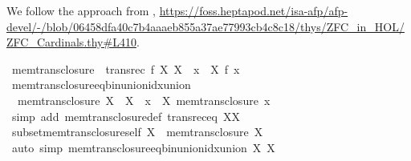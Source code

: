 \begin{isabellebody}
\begin{isamarkuptext}
We follow the approach from \cite{ZFC_in_HOL_AFP}, 
\url{https://foss.heptapod.net/isa-afp/afp-devel/-/blob/06458dfa40c7b4aaaeb855a37ae77993cb4c8c18/thys/ZFC_in_HOL/ZFC_Cardinals.thy\#L410}.%
\end{isamarkuptext}\isamarkuptrue%
\isamarkupfalse%
\ {\isachardoublequoteopen}mem{\isacharunderscore}{\kern0pt}trans{\isacharunderscore}{\kern0pt}closure\ {\isasymequiv}\ transrec\ {\isacharparenleft}{\kern0pt}{\isasymlambda}f\ X{\isachardot}{\kern0pt}\ X\ {\isasymunion}\ {\isacharparenleft}{\kern0pt}{\isasymUnion}x\ {\isasymin}\ X{\isachardot}{\kern0pt}\ f\ x{\isacharparenright}{\kern0pt}{\isacharparenright}{\kern0pt}{\isachardoublequoteclose}\isanewline
\isanewline
{}\isamarkupfalse%
\ mem{\isacharunderscore}{\kern0pt}trans{\isacharunderscore}{\kern0pt}closure{\isacharunderscore}{\kern0pt}eq{\isacharunderscore}{\kern0pt}bin{\isacharunderscore}{\kern0pt}union{\isacharunderscore}{\kern0pt}idx{\isacharunderscore}{\kern0pt}union{\isacharcolon}{\kern0pt}\isanewline
\ \ {\isachardoublequoteopen}mem{\isacharunderscore}{\kern0pt}trans{\isacharunderscore}{\kern0pt}closure\ X\ {\isacharequal}{\kern0pt}\ X\ {\isasymunion}\ {\isacharparenleft}{\kern0pt}{\isasymUnion}x\ {\isasymin}\ X{\isachardot}{\kern0pt}\ mem{\isacharunderscore}{\kern0pt}trans{\isacharunderscore}{\kern0pt}closure\ x{\isacharparenright}{\kern0pt}{\isachardoublequoteclose}\isanewline
%
\isadelimproof
\ \ %
\endisadelimproof
%
\isatagproof
{}\isamarkupfalse%
\ {\isacharparenleft}{\kern0pt}simp\ add{\isacharcolon}{\kern0pt}\ mem{\isacharunderscore}{\kern0pt}trans{\isacharunderscore}{\kern0pt}closure{\isacharunderscore}{\kern0pt}def\ transrec{\isacharunderscore}{\kern0pt}eq{\isacharbrackleft}{\kern0pt}\ {\isacharquery}{\kern0pt}X{\isacharequal}{\kern0pt}X{\isacharbrackright}{\kern0pt}{\isacharparenright}{\kern0pt}%
\endisatagproof
{\isafoldproof}%
%
\isadelimproof
\isanewline
%
\endisadelimproof
\isanewline
{}\isamarkupfalse%
\ subset{\isacharunderscore}{\kern0pt}mem{\isacharunderscore}{\kern0pt}trans{\isacharunderscore}{\kern0pt}closure{\isacharunderscore}{\kern0pt}self{\isacharcolon}{\kern0pt}\ {\isachardoublequoteopen}X\ {\isasymsubseteq}\ mem{\isacharunderscore}{\kern0pt}trans{\isacharunderscore}{\kern0pt}closure\ X{\isachardoublequoteclose}\isanewline
%
\isadelimproof
\ \ %
\endisadelimproof
%
\isatagproof
{}\isamarkupfalse%
\ {\isacharparenleft}{\kern0pt}auto\ simp{\isacharcolon}{\kern0pt}\ mem{\isacharunderscore}{\kern0pt}trans{\isacharunderscore}{\kern0pt}closure{\isacharunderscore}{\kern0pt}eq{\isacharunderscore}{\kern0pt}bin{\isacharunderscore}{\kern0pt}union{\isacharunderscore}{\kern0pt}idx{\isacharunderscore}{\kern0pt}union{\isacharbrackleft}{\kern0pt}\ {\isacharquery}{\kern0pt}X{\isacharequal}{\kern0pt}\ X{\isacharbrackright}{\kern0pt}{\isacharparenright}{\kern0pt}%

\end{isabellebody}
